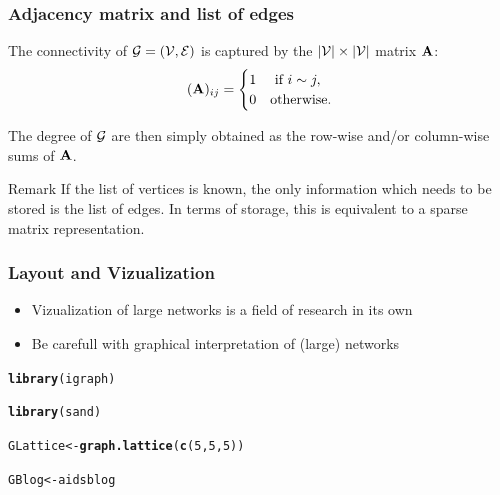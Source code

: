 \documentclass{beamer}\usepackage[]{graphicx}\usepackage[]{color}
\makeatletter
\newcommand{\hlnum}[1]{\textcolor[rgb]{0.686,0.059,0.569}{#1}}%
\newcommand{\hlstd}[1]{\textcolor[rgb]{0.345,0.345,0.345}{#1}}%
\newcommand{\hlkwb}[1]{\textcolor[rgb]{0.69,0.353,0.396}{#1}}%
\newcommand{\hlkwd}[1]{\textcolor[rgb]{0.737,0.353,0.396}{\textbf{#1}}}%
\newenvironment{kframe}{%
 \def\at@end@of@kframe{}%
 \ifinner\ifhmode%
  \def\at@end@of@kframe{\end{minipage}}%
  \begin{minipage}{\columnwidth}%
 \fi\fi%
 \def\FrameCommand##1{\hskip\@totalleftmargin \hskip-\fboxsep
 \colorbox{shadecolor}{##1}\hskip-\fboxsep
     \hskip-\linewidth \hskip-\@totalleftmargin \hskip\columnwidth}%
 \MakeFramed {\advance\hsize-\width
   \@totalleftmargin\z@ \linewidth\hsize
   \@setminipage}}%
 {\par\unskip\endMakeFramed%
 \at@end@of@kframe}
\newenvironment{knitrout}{}{} %
\makeatother
\begin{document}
\begin{frame}
  \frametitle{Adjacency matrix and list of edges}

  \begin{definition}
    The connectivity of  $\mathcal{G} = (\mathcal{V},\mathcal{E})$ is captured by the $|\mathcal{V}|\times |\mathcal{V}|$ matrix $\mathbf{A}$:
    \[
      (\mathbf{A})_{ij} = \begin{cases}
      1  & \text{ if } i \sim j,\\
      0  & \text{otherwise}.
      \end{cases}
    \]
  \end{definition}

  \begin{proposition}
    The degree of $\mathcal{G}$ are then simply obtained as the row-wise and/or column-wise sums of $\mathbf{A}$.
  \end{proposition}

  \begin{block}{Remark}
    If the list of vertices is known, the only information which needs to be stored is the list of edges. In terms of storage, this is equivalent to a sparse matrix representation.
  \end{block}
  
\end{frame}

\begin{frame}
  \frametitle{Layout and Vizualization}
  
  \begin{itemize}
    \item Vizualization of large networks is a field of research in its own
    \item Be carefull with graphical interpretation of (large) networks
  \end{itemize}

\begin{knitrout}\scriptsize
{}\color{fgcolor}\begin{kframe}
\begin{alltt}
\hlkwd{library}\hlstd{(igraph)}

\hlkwd{library}\hlstd{(sand)}

\hlstd{GLattice} \hlkwb{<-} \hlkwd{graph.lattice}\hlstd{(}\hlkwd{c}\hlstd{(}\hlnum{5}\hlstd{,}\hlnum{5}\hlstd{,}\hlnum{5}\hlstd{))}

\hlstd{GBlog}    \hlkwb{<-} \hlstd{aidsblog}
\end{alltt}
\end{kframe}
\end{knitrout}
  
\end{frame}
\end{document}
